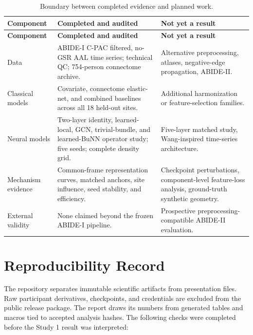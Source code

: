 \documentclass[11pt,a4paper]{article}
\begin{document}
\begin{longtable}{@{}p{3.2cm}p{5.6cm}p{5.5cm}@{}}
\caption{Boundary between completed evidence and planned work.}\label{tab:status}\\
\toprule
\textbf{Component} & \textbf{Completed and audited} & \textbf{Not yet a result} \\
\midrule
\endfirsthead
\toprule
\textbf{Component} & \textbf{Completed and audited} & \textbf{Not yet a result} \\
\midrule
\endhead
Data & ABIDE-I C-PAC filtered, no-GSR AAL time series; technical QC; 754-person connectome archive. & Alternative preprocessing, atlases, negative-edge propagation, ABIDE-II. \\
Classical models & Covariate, connectome elastic-net, and combined baselines across all 18 held-out sites. & Additional harmonization or feature-selection families. \\
Neural models & Two-layer identity, learned-local, GCN, trivial-bundle, and learned-BuNN operator study; five seeds; complete density grid. & Five-layer matched study, Wang-inspired time-series architecture. \\
Mechanism evidence & Common-frame representation curves, matched anchors, site influence, seed stability, and efficiency. & Checkpoint perturbations, component-level feature-loss analysis, ground-truth synthetic geometry. \\
External validity & None claimed beyond the frozen ABIDE-I pipeline. & Prospective preprocessing-compatible ABIDE-II evaluation. \\
\bottomrule
\end{longtable}

\clearpage
\appendix
\section{Reproducibility Record}

The repository separates immutable scientific artifacts from presentation
files. Raw participant derivatives, checkpoints, and credentials are excluded
from the public release package. The report draws its numbers from generated
tables and macros tied to accepted analysis hashes. The following checks were
completed before the Study 1 result was interpreted:
\end{document}
